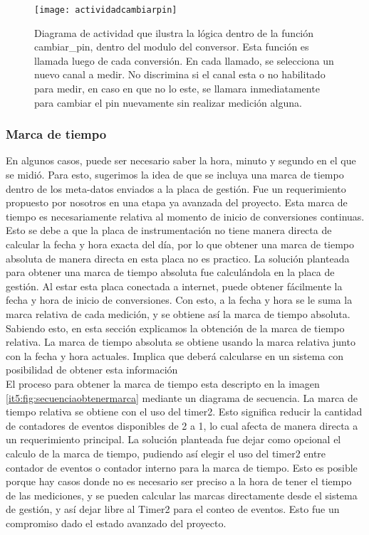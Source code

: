 \begin{figure}[h]
  \centering
  \texttt{[image: actividadcambiarpin]}
  \caption[Diagrama de actividad de la función cambiar pin]{Diagrama de actividad que ilustra la lógica dentro de la función cambiar\_pin, dentro del modulo del conversor. Esta función es llamada luego de cada conversión. En cada llamado, se selecciona un nuevo canal a medir. No discrimina si el canal esta o no habilitado para medir, en caso en que no lo este, se llamara inmediatamente para cambiar el pin nuevamente sin realizar medición alguna.}\label{it5:fig:actividadcambiarpin}
\end{figure}

\subsubsection{Marca de tiempo} %
\label{ssub:marca_de_tiempo}

En algunos casos, puede ser necesario saber la hora, minuto y segundo en el que se midió. Para esto, sugerimos la idea de que se incluya una marca de tiempo dentro de los meta-datos enviados a la placa de gestión. Fue un requerimiento propuesto por nosotros en una etapa ya avanzada del proyecto. Esta marca de tiempo es necesariamente relativa al momento de inicio de conversiones continuas. Esto se debe a que la placa de instrumentación no tiene manera directa de calcular la fecha y hora exacta del día, por lo que obtener una marca de tiempo absoluta de manera directa en esta placa no es practico. 
La solución planteada para obtener una marca de tiempo absoluta fue calculándola en la placa de gestión. Al estar esta placa conectada a internet, puede obtener fácilmente la fecha y hora de inicio de conversiones. Con esto, a la fecha y hora se le suma la marca relativa de cada medición, y se obtiene así la marca de tiempo absoluta. Sabiendo esto, en esta sección explicamos la obtención de la marca de tiempo relativa. La marca de tiempo absoluta se obtiene usando la marca relativa junto con la fecha y hora actuales. Implica que deberá calcularse en un sistema con posibilidad de obtener esta información \\

El proceso para obtener la marca de tiempo esta descripto en la imagen \ref{it5:fig:secuenciaobtenermarca} mediante un diagrama de secuencia. La marca de tiempo relativa se obtiene con el uso del timer2. Esto significa reducir la cantidad de contadores de eventos disponibles de 2 a 1, lo cual afecta de manera directa a un requerimiento principal. La solución planteada fue dejar como opcional el calculo de la marca de tiempo, pudiendo así elegir el uso del timer2 entre contador de eventos o contador interno para la marca de tiempo. Esto es posible porque hay casos donde no es necesario ser preciso a la hora de tener el tiempo de las mediciones, y se pueden calcular las marcas directamente desde el sistema de gestión, y así dejar libre al Timer2 para el conteo de eventos. Esto fue un compromiso dado el estado avanzado del proyecto.


